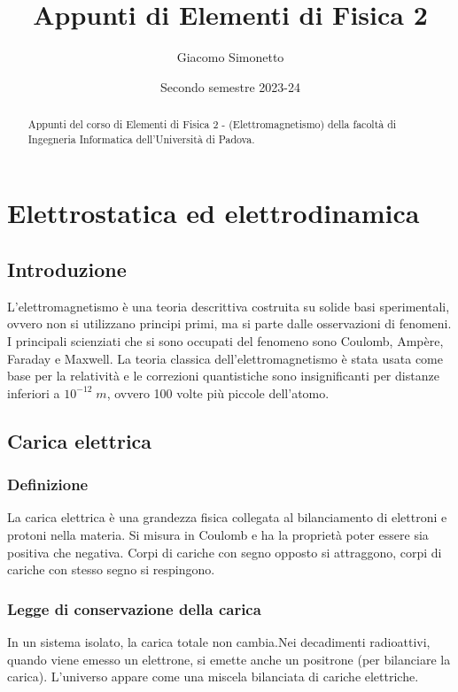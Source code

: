 \documentclass[a4paper]{article}
\title{Appunti di Elementi di Fisica 2}
\author{Giacomo Simonetto}
\date{Secondo semestre 2023-24}
\begin{document}
\maketitle
\begin{abstract}
	Appunti del corso di Elementi di Fisica 2 - (Elettromagnetismo) della facoltà di Ingegneria Informatica dell'Università di Padova.
\end{abstract}

\newpage

\tableofcontents

\newpage

\section{Elettrostatica ed elettrodinamica}
\subsection{Introduzione}
L'elettromagnetismo è una teoria descrittiva costruita su solide basi sperimentali, ovvero non si utilizzano principi primi, ma
si parte dalle osservazioni di fenomeni. I principali scienziati che si sono occupati del fenomeno sono Coulomb, Ampère, Faraday
e Maxwell. La teoria classica dell'elettromagnetismo è stata usata come base per la relatività e le correzioni quantistiche sono
insignificanti per distanze inferiori a \(10^{-12} \; m\), ovvero 100 volte più piccole dell'atomo.

\subsection{Carica elettrica}
\subsubsection*{Definizione}
La carica elettrica è una grandezza fisica collegata al bilanciamento di elettroni e protoni nella materia. Si misura in Coulomb
e ha la proprietà poter essere sia positiva che negativa. Corpi di cariche con segno opposto si attraggono, corpi di cariche con
stesso segno si respingono.

\subsubsection*{Legge di conservazione della carica}
In un sistema isolato, la carica totale non cambia.Nei decadimenti radioattivi, quando viene emesso un elettrone, si emette anche
un positrone (per bilanciare la carica). L'universo appare come una miscela bilanciata di cariche elettriche.
\end{document}

